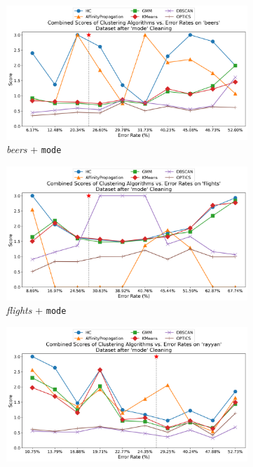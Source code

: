 \documentclass[10pt]{article} %
\numberwithin{equation}{section}
\begin{document}
\begin{figure}[htbp]
  \begin{subfigure}{0.24\linewidth} %
    \centering
    \includegraphics[width=\linewidth]{mode_beers_combined_scores.png}
    \caption{\textit{beers} + \texttt{mode}}
    \label{fig:mode_beers}
  \end{subfigure}
  \hfill
  \begin{subfigure}{0.24\linewidth}
    \centering
    \includegraphics[width=\linewidth]{mode_flights_combined_scores.png}
    \caption{\textit{flights} + \texttt{mode}}
    \label{fig:mode_flights}
  \end{subfigure}
  \hfill
  \begin{subfigure}{0.24\linewidth}
    \centering
    \includegraphics[width=\linewidth]{mode_rayyan_combined_scores.png}

\end{subfigure}
\end{figure}
\end{document}
